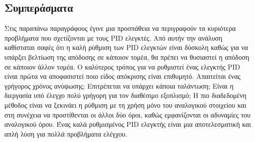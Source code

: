 \subsection{Συμπεράσματα}

Στις παραπάνω παραγράφους έγινε μια προσπάθεια να περιγραφούν τα κυριότερα προβλήματα που σχετίζονται με τους PID ελεγκτές. Από αυτήν την ανάλυση καθίσταται σαφές ότι η καλή ρύθμιση των PID ελεγκτών είναι δύσκολη καθώς για να υπάρξει βελτίωση της απόδοσης σε κάποιον τομέα, θα πρέπει να θυσιαστεί η απόδοση σε κάποιον άλλον τομέα. Ο καλύτερος τρόπος για να ρυθμιστεί ένας ελεγκτής PID είναι πρώτα να αποφασιστεί ποιο είδος απόκρισης είναι επιθυμητό. Απαιτείται ένας γρήγορος χρόνος ανύψωσης; Επιτρέπεται να υπάρχει κάποια ταλάντωση; Είναι η διεργασία υπό έλεγχο πολύ γρήγορη για τον διαθέσιμο εξοπλισμό; Η πιο διαδεδομένη μέθοδος είναι να ξεκινάει η ρύθμιση με τη χρήση μόνο του αναλογικού στοιχείου και στη συνέχεια να προστίθενται οι άλλοι δύο όροι, καθώς εμφανίζονται οι αδυναμίες του αναλογικού όρου. Ένας καλά ρυθμισμένος PID ελεγκτής είναι μια αποτελεσματική και απλή λύση για πολλά προβλήματα ελέγχου.




